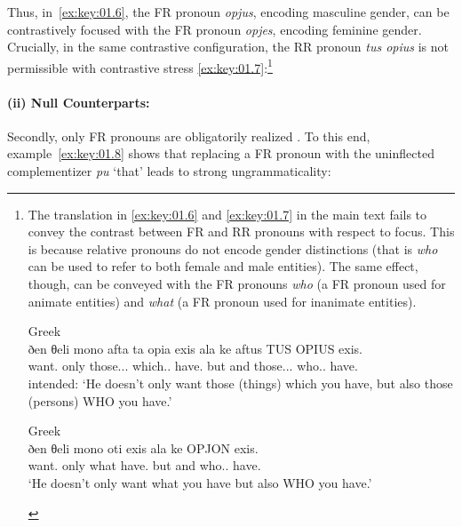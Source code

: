 \documentclass[output=paper]{langsci/langscibook}
\begin{document}
Thus, in~\eqref{ex:key:01.6}, the \gls{FR} pronoun \emph{opjus}, encoding masculine gender,
can be contrastively focused with the \gls{FR} pronoun \emph{opjes}, encoding
feminine gender. Crucially, in the same contrastive configuration, the
\gls{RR} pronoun \emph{tus opius} is not permissible with contrastive stress
\eqref{ex:key:01.7}:\footnote{The  translation in \eqref{ex:key:01.6} and
    \eqref{ex:key:01.7} in the main text fails to convey the
    contrast between \gls{FR} and \gls{RR} pronouns with respect to focus. This
    is because  relative pronouns do not encode gender
    distinctions (that is \emph{who} can be used to refer to both female and
    male entities). The same effect, though, can be conveyed with the
     \gls{FR} pronouns \emph{who} (a \gls{FR} pronoun used for
    animate entities) and \emph{what} (a \gls{FR} pronoun used for inanimate
    entities).

\begin{exe}
     Greek\\
    \gll \llap{*}ðen θeli mono afta {ta opia} exis ala ke aftus {TUS OPIUS} exis.\\
    \Neg{} want.\Tsg{} only those.\glossN.\Pl.\Acc{} which.\glossN.\Pl{} have.\Ssg{} but and those.\M.\Pl.\Acc{} who.\M{}.\Pl{} have.\Ssg{}\\
    \glt intended: \enquote*{He doesn’t only want those (things) which you
            have, but also those (persons) WHO you have.}
\end{exe}

\begin{exe}
     Greek\\
	\gll ðen θeli mono oti exis ala ke OPJON exis.\\
		\Neg{} want.\Tsg{} only what have.\Ssg{} but and who.\M.\Sg{} have.\Ssg{}\\
	\glt \enquote*{He doesn’t only want what you have but also WHO you have.}
\end{exe}}

\paragraph*{(ii) Null Counterparts:} Secondly, only \gls{FR} pronouns are
obligatorily realized \parencite[22]{AleLawMeiWil2000}. To this end,
example~\eqref{ex:key:01.8} shows that replacing a \gls{FR} pronoun with the
uninflected complementizer \emph{pu} ‘that’ leads to strong ungrammaticality:
\end{document}
